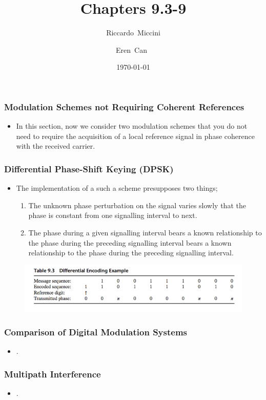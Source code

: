 \documentclass{beamer}
\title{Chapters 9.3-9}
\subtitle{}
\author[Riccardo \and Eren]{Riccardo~Miccini\inst{1} \and Eren~Can~\inst{1}}
\institute[DTU]
{
	\inst{1}
	Technical University of Denmark\\
	Digital Communication
}
\date{\today}
\begin{document}
\frame{\titlepage}

\begin{frame}
	\frametitle{Modulation Schemes not Requiring Coherent References}
	\begin{itemize}
		\item In this section, now we consider two modulation schemes that you do not need to require the acquisition of  a local reference signal in phase coherence with the received carrier. 
	\end{itemize}
\end{frame}

\begin{frame}
	\frametitle{Differential Phase-Shift Keying  (DPSK)}
	\begin{itemize}
		\item The implementation of a such a scheme presupposes two things;
		\begin{enumerate}
		\item The unknown phase perturbation on the signal varies  slowly that the phase is constant from one signalling interval to next.
		\item  The phase during a given signalling interval bears a known relationship to the phase during the preceding signalling interval bears a known relationship to the phase during the preceding signalling interval.
	\end{enumerate}
	\end{itemize}
	\begin{figure}
	\includegraphics[width=\textwidth]{9_3.png}
	\end{figure}
\end{frame}


\begin{frame}
	\frametitle{Comparison of Digital Modulation Systems}
	\begin{itemize}
		\item .
	\end{itemize}
\end{frame}


\begin{frame}
	\frametitle{Multipath Interference}
	\begin{itemize}
		\item .
	\end{itemize}
\end{frame}
\end{document}
